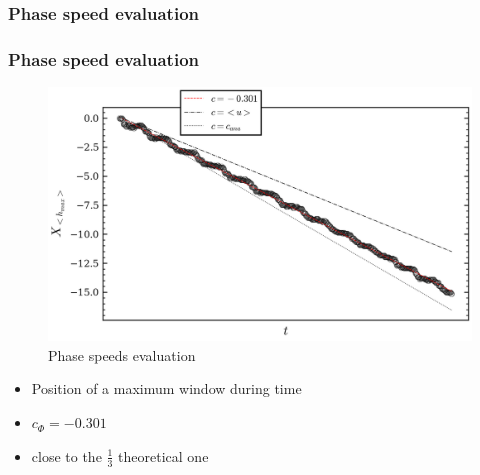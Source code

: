 \documentclass[numbering=fraction]{beamer}
\begin{document}
\subsubsection{Phase speed evaluation}
\begin{frame}
    \frametitle{Phase speed evaluation}
    \begin{minipage}{.6\linewidth}

        \begin{figure}[H]
            \includegraphics[width=\linewidth]{./figure/mean_height.png}
            \caption{Phase speeds evaluation}
        \end{figure}
    \end{minipage}
    \begin{minipage}{.3\linewidth}
        \begin{itemize}
            \item Position of a maximum window during time
            \item $c_\Phi = -0.301$
            \item close to the $\frac{1}{3}$ theoretical one
        \end{itemize}
    \end{minipage}

\end{frame}
\end{document}
